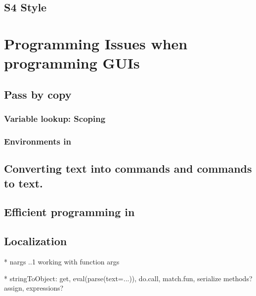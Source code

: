 



\subsection{S4 Style}
\label{sec:PROG:S4}



\section{Programming Issues when programming GUIs}
\label{sec:ProgrammingIssues}

\subsection{Pass by copy}
\label{sec:pass-by-copy}


\subsubsection{Variable lookup: Scoping}
\label{sec:vari-look-scop}

\subsubsection{Environments in \R}
\label{sec:environements-r}



\subsection{Converting text into \R\/ commands and \R\/ commands to text.}
\label{sec:text-to-R}



\subsection{Efficient programming in \R}
\label{sec:efficient-programming}
  
  
\subsection{Localization}
\label{sec:localization}




* nargs ..1 working with function args

* stringToObject: get, eval(parse(text=...)), do.call, match.fun,
serialize methods? assign, expressions?


